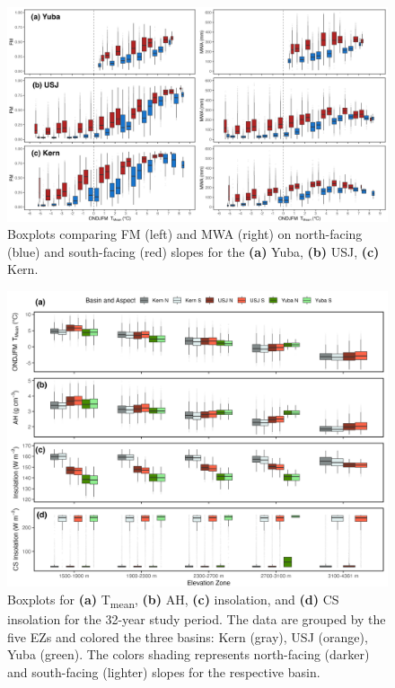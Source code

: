 \begin{figure}[t]
\centering
\includegraphics[width=\textwidth]{figures/ch2_figs/aspect_temp_mwa_fum_full_boxplots_v2.png}
\caption{Boxplots comparing FM (left) and MWA (right) on north-facing (blue) and south-facing (red) slopes for the \textbf{(a)} Yuba, \textbf{(b)} USJ, \textbf{(c)} Kern.}
\label{fig:aspec_mwa_fm_bp}
\end{figure}

\begin{figure}[h]
\centering
\includegraphics[width=\textwidth]{figures/ch2_figs/met4_boxplot_v4.png}
\caption{ Boxplots for \textbf{(a)} T\textsubscript{mean}, \textbf{(b)} AH, \textbf{(c)} insolation, and \textbf{(d)} CS insolation for the 32-year study period. The data are grouped by the five EZs and colored the three basins: Kern (gray), USJ (orange), Yuba (green). The colors shading represents north-facing (darker) and south-facing (lighter) slopes for the respective basin.}
\label{fig:met_boxplots}
\end{figure}


